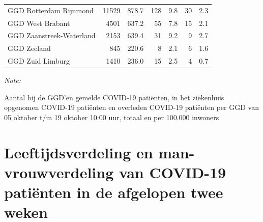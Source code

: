\documentclass[
  english,
  man,floatsintext]{apa6}
\begin{document}
\begin{table}[H]
\begin{threeparttable}
\begin{tabular}{lrrrrrr}
GGD Rotterdam Rijnmond & 11529 & 878.7 & 128 & 9.8 & 30 & 2.3\\
GGD West Brabant & 4501 & 637.2 & 55 & 7.8 & 15 & 2.1\\
GGD Zaanstreek-Waterland & 2153 & 639.4 & 31 & 9.2 & 9 & 2.7\\
GGD Zeeland & 845 & 220.6 & 8 & 2.1 & 6 & 1.6\\
GGD Zuid Limburg & 1410 & 236.0 & 15 & 2.5 & 4 & 0.7\\
\bottomrule
\end{tabular}
\begin{tablenotes}
\item \textit{Note: } 
\item Aantal bij de GGD’en gemelde COVID-19 patiënten, in het ziekenhuis opgenomen COVID-19 patiënten en overleden COVID-19 patiënten per GGD van 05 oktober t/m 19 oktober 10:00 uur, totaal en per 100.000 inwoners
\end{tablenotes}
\end{threeparttable}
\endgroup{}
\end{table}

\newpage

\hypertarget{leeftijdsverdeling-en-man-vrouwverdeling-van-covid-19-patiuxebnten-in-de-afgelopen-twee-weken}{%
\section{Leeftijdsverdeling en man-vrouwverdeling van COVID-19 patiënten in de afgelopen twee weken}\label{leeftijdsverdeling-en-man-vrouwverdeling-van-covid-19-patiuxebnten-in-de-afgelopen-twee-weken}}
\end{document}
